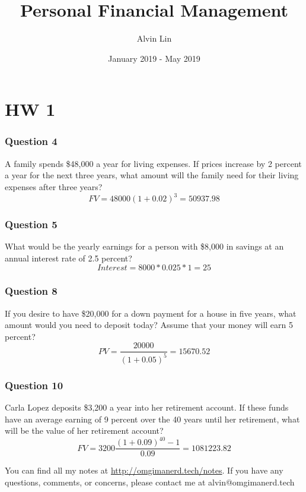 \documentclass{math}
\title{Personal Financial Management}
\author{Alvin Lin}
\date{January 2019 - May 2019}
\begin{document}
\maketitle

\section*{HW 1}

\subsubsection*{Question 4}
A family spends \$48,000 a year for living expenses. If prices increase by 2
percent a year for the next three years, what amount will the family need for
their living expenses after three years?
\[ FV = 48000(1+0.02)^3 = 50937.98 \]

\subsubsection*{Question 5}
What would be the yearly earnings for a person with \$8,000 in savings at an
annual interest rate of 2.5 percent?
\[ Interest = 8000 * 0.025 * 1 = 25 \]

\subsubsection*{Question 8}
If you desire to have \$20,000 for a down payment for a house in five years,
what amount would you need to deposit today? Assume that your money will earn
5 percent?
\[ PV = \frac{20000}{(1+0.05)^5} = 15670.52 \]

\subsubsection*{Question 10}
Carla Lopez deposits \$3,200 a year into her retirement account. If these funds
have an average earning of 9 percent over the 40 years until her retirement,
what will be the value of her retirement account?
\[ FV = 3200\frac{(1+0.09)^{40}-1}{0.09} = 1081223.82 \]

\begin{center}
  You can find all my notes at \url{http://omgimanerd.tech/notes}. If you have
  any questions, comments, or concerns, please contact me at
  alvin@omgimanerd.tech
\end{center}
\end{document}
